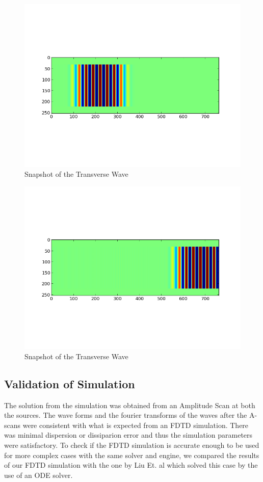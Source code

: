 \begin{figure}[ht]
\centering
\includegraphics[scale=0.6]{images/chapter_3/simulation_picture_transverse.png}
\caption{Snapshot of the Transverse Wave}
\end{figure}

\begin{figure}[!ht]
\centering
\includegraphics[scale=0.6]{images/chapter_3/wave_trans.png}
\caption{Snapshot of the Transverse Wave}

\end{figure}

\subsection{Validation of Simulation}
The solution from the simulation was obtained from an Amplitude Scan at both the sources. The wave forms and the fourier transforms of the waves after the A-scans were consistent with what is expected from an FDTD simulation. There was minimal dispersion or dissiparion error and thus the simulation parameters were satisfactory. To check if the FDTD simulation is accurate enough to be used for more complex cases with the same solver and engine, we compared the results of our FDTD simulation with the one by Liu Et. al \cite{Liu} which solved this case by the use of an ODE solver. 

